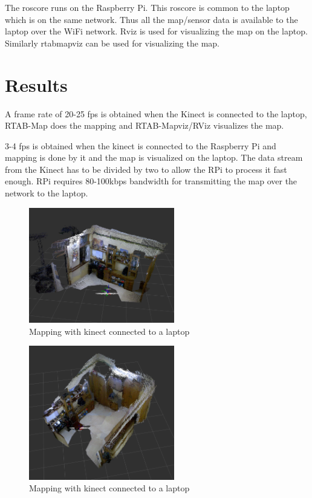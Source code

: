 \documentclass[journal]{IEEEtran}
\begin{document}
The roscore runs on the Raspberry Pi. This roscore is common to the laptop which is on the same network. Thus all the map/sensor data is available to the laptop over the WiFi network.
Rviz is used for visualizing the map on the laptop. Similarly rtabmapviz can be used for visualizing the map.


\section{Results}
A frame rate of 20-25 fps is obtained when the Kinect is connected to the laptop, RTAB-Map does the mapping and RTAB-Mapviz/RViz visualizes the map. 

3-4 fps is obtained when the kinect is connected to the Raspberry Pi and mapping is done by it and the map is visualized on the laptop. The data stream from the Kinect has to be divided by two to allow the RPi to process it fast enough. RPi requires 80-100kbps bandwidth for transmitting the map over the network to the laptop.

\begin{figure}[ht]
\centering
\includegraphics[width=2.5in]{1(1).png}
\caption{Mapping with kinect connected to a laptop}
\label{fig_sim}
\end{figure}
 
\begin{figure}[ht]
	\centering
	\includegraphics[width=2.5in]{1(2).png}
	\caption{Mapping with kinect connected to a laptop}
	\label{fig_sim}
\end{figure}
\end{document}
